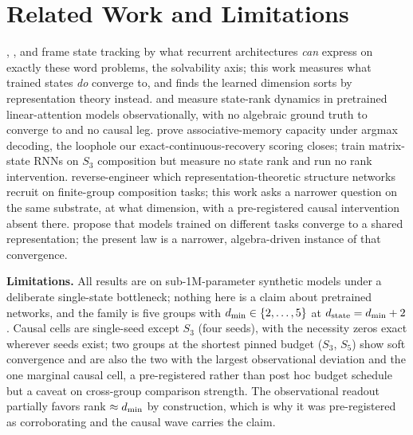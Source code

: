 \section{Related Work and Limitations}
\label{sec:related}

\citet{merrill2024illusion}, \citet{grazzi2025negative}, and
\citet{siems2025deltaproduct} frame state tracking by what recurrent
architectures \emph{can} express on exactly these word problems, the
solvability axis; this work measures what trained states \emph{do}
converge to, and finds the learned dimension sorts by representation
theory instead. \citet{nazari2026rank} and \citet{sun2026staterank}
measure state-rank dynamics in pretrained linear-attention models
observationally, with no algebraic ground truth to converge to and no
causal leg. \citet{nichani2025factual} prove associative-memory capacity
under argmax decoding, the loophole our exact-continuous-recovery
scoring closes; \citet{mishra2026m2rnn} train matrix-state RNNs on $S_3$
composition but measure no state rank and run no rank intervention.
\citet{chughtai2023toy} reverse-engineer which representation-theoretic
structure networks recruit on finite-group composition tasks; this work
asks a narrower question on the same substrate, at what dimension, with
a pre-registered causal intervention absent there.
\citet{huh2024platonic} propose that models trained on different tasks
converge to a shared representation; the present law is a narrower,
algebra-driven instance of that convergence.

\textbf{Limitations.} All results are on sub-1M-parameter synthetic
models under a deliberate single-state bottleneck; nothing here is a
claim about pretrained networks, and the family is five groups with
$d_{\min} \in \{2,\dots,5\}$ at $d_{\mathrm{state}} = d_{\min} + 2$. Causal cells are
single-seed except $S_3$ (four seeds), with the necessity zeros exact
wherever seeds exist; two groups at the shortest pinned budget ($S_3$,
$S_5$) show soft convergence and are also the two with the largest
observational deviation and the one marginal causal cell, a
pre-registered rather than post hoc budget schedule but a caveat on
cross-group comparison strength. The observational readout partially
favors rank $\approx d_{\min}$ by construction, which is why it was
pre-registered as corroborating and the causal wave carries the claim.
